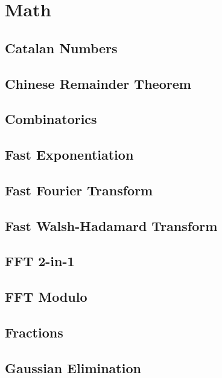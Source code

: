\section{Math}
\subsection{Catalan Numbers}
\raggedbottom
\hrulefill
\subsection{Chinese Remainder Theorem}
\raggedbottom
\hrulefill
\subsection{Combinatorics}
\raggedbottom
\hrulefill
\subsection{Fast Exponentiation}
\raggedbottom
\hrulefill
\subsection{Fast Fourier Transform}
\raggedbottom
\hrulefill
\subsection{Fast Walsh-Hadamard Transform}
\raggedbottom
\hrulefill
\subsection{FFT 2-in-1}
\raggedbottom
\hrulefill
\subsection{FFT Modulo}
\raggedbottom
\hrulefill
\subsection{Fractions}
\raggedbottom
\hrulefill
\subsection{Gaussian Elimination}
\raggedbottom
\hrulefill
